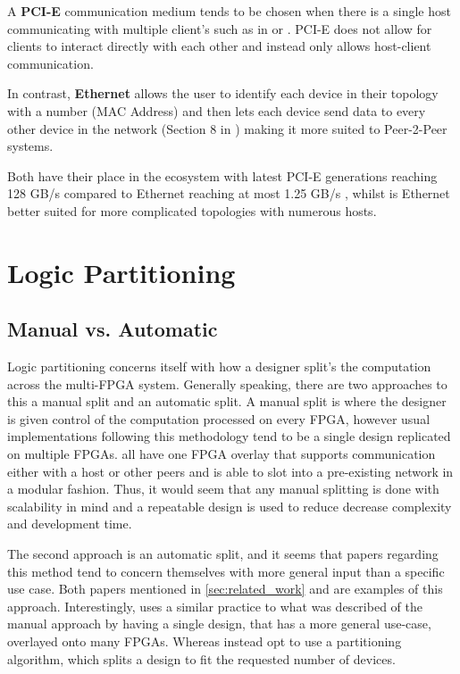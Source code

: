 A \textbf{PCI-E} communication medium tends to be chosen when there is a single host communicating with multiple client's such as in \cite{10.1145/3337821.3337846} or \cite{6927459}. PCI-E does not allow for clients to interact directly with each other and instead only allows host-client communication. 

In contrast, \textbf{Ethernet} allows the user to identify each device in their topology with a number (MAC Address) and then lets each device send data to every other device in the network (Section 8 in \cite{6847097}) making it more suited to Peer-2-Peer systems. 

Both have their place in the ecosystem with latest PCI-E generations reaching 128 GB/s \cite{pcie-speed} compared to Ethernet reaching at most 1.25 GB/s \cite{ether-speed}, whilst is Ethernet better suited for more complicated topologies with numerous hosts.

\section{Logic Partitioning}
\label{sec:logic_part}

\subsection{Manual vs. Automatic}

Logic partitioning concerns itself with how a designer split's the computation across the multi-FPGA system. Generally speaking, there are two approaches to this a manual split and an automatic split. A manual split is where the designer is given control of the computation processed on every FPGA, however usual implementations following this methodology tend to be a single design replicated on multiple FPGAs. \cite{10.1145/3020078.3021739, 10.1145/3358192, 10.1145/3337821.3337846} all have one FPGA overlay that supports communication either with a host or other peers and is able to slot into a pre-existing network in a modular fashion. Thus, it would seem that any manual splitting is done with scalability in mind and a repeatable design is used to reduce decrease complexity and development time.

The second approach is an automatic split, and it seems that papers regarding this method tend to concern themselves with more general input than a specific use case. Both papers mentioned in \autoref{sec:related_work} and \cite{soton261305} are examples of this approach. Interestingly, \cite{707888} uses a similar practice to what was described of the manual approach by having a single design, that has a more general use-case, overlayed onto many FPGAs. Whereas \cite{564741, soton261305} instead opt to use a partitioning algorithm, which splits a design to fit the requested number of devices. 


